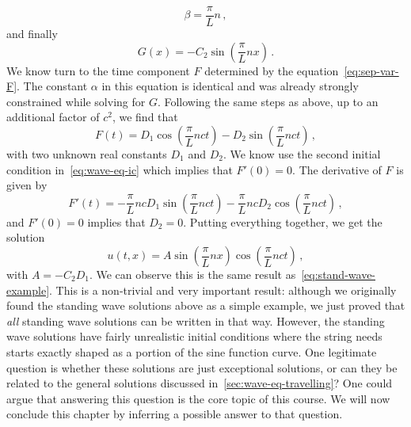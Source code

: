 \begin{equation}
	\beta=\frac{\pi}{L}n\,,
\end{equation}
and finally
\begin{equation}
	G(x)=-C_2\sin\left(\frac{\pi}{L}nx\right)\,.
\end{equation}
We know turn to the time component $F$ determined by the equation~\cref{eq:sep-var-F}. The
constant $\alpha$ in this equation is identical and was already strongly constrained while
solving for $G$. Following the same steps as above, up to an additional factor of $c^2$,
we find that
\begin{equation}
	F(t)=D_1\cos\left(\frac{\pi}{L}nc t\right)-D_2\sin\left(\frac{\pi}{L}nc t\right)\,,
\end{equation}
with two unknown real constants $D_1$ and $D_2$. We know use the second initial condition
in~\cref{eq:wave-eq-ic} which implies that $F'(0)=0$. The derivative of $F$ is given by
\begin{equation}
	F'(t)=-\frac{\pi}{L}ncD_1\sin\left(\frac{\pi}{L}nc t\right)-\frac{\pi}{L}ncD_2
	\cos\left(\frac{\pi}{L}nc t\right)\,,
\end{equation}
and $F'(0)=0$ implies that $D_2=0$. Putting everything together, we get the solution
\begin{equation}
	u(t,x)=A\sin\left(\frac{\pi}{L}nx\right)\cos\left(\frac{\pi}{L}nct\right)\,,
\end{equation}
with $A=-C_2D_1$. We can observe this is the same result as~\cref{eq:stand-wave-example}.
This is a non-trivial and very important result: although we originally found the standing
wave solutions above as a simple example, we just proved that \emph{all} standing wave
solutions can be written in that way. However, the standing wave solutions have fairly
unrealistic initial conditions where the string needs starts exactly shaped as a portion
of the sine function curve. One legitimate question is whether these solutions are just
exceptional solutions, or can they be related to the general solutions discussed
in~\cref{sec:wave-eq-travelling}? One could argue that answering this question is the core
topic of this course. We will now conclude this chapter by inferring a possible answer to
that question.
